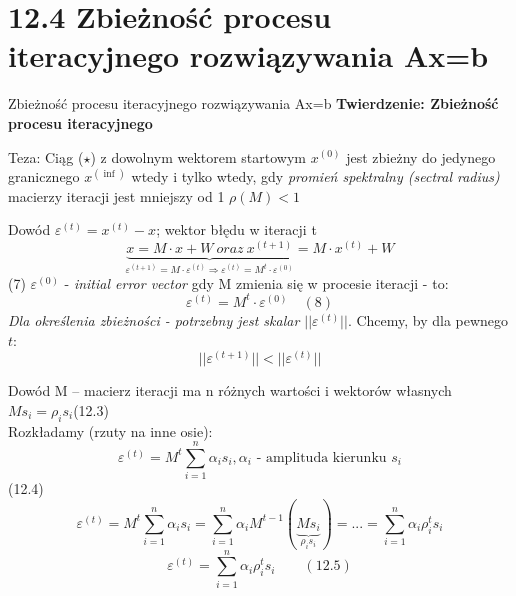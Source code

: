 \section{12.4 Zbieżność procesu iteracyjnego rozwiązywania Ax=b}

\begin{frame}{Zbieżność procesu iteracyjnego rozwiązywania Ax=b}
  \textbf{Twierdzenie: Zbieżność procesu iteracyjnego}
  \begin{block}{Teza:}
    \center Ciąg ($\star$) z dowolnym wektorem startowym $x^{(0)}$ jest zbieżny do jedynego granicznego $x^{(\inf)}$ wtedy i tylko wtedy, gdy \emph{promień spektralny (sectral radius)} macierzy iteracji jest mniejszy od 1
    \center $\rho(M)<1$
  \end{block}
\end{frame}

\begin{frame}{}
  \begin{block}{Dowód}
    $\varepsilon^{(t)}=x^{(t)}-x$; wektor błędu w iteracji t
    \[\underbrace{x=M \cdot x+W\ oraz\ x^{(t+1)}}_{\varepsilon^{(t+1)}=M \cdot \varepsilon^{(t)} \Rightarrow \varepsilon^{(t)}=M^t \cdot \varepsilon^{(0)}}=M \cdot x^{(t)}+W\]
    (7) $\varepsilon^{(0)}$ - \emph{initial error vector} gdy M zmienia się w procesie iteracji - to:
    \[{\varepsilon}^{(t)}=M^t \cdot {\varepsilon}^{(0)} \quad (8)\]
    \emph{Dla określenia zbieżności - potrzebny jest skalar $||\varepsilon^{(t)}||$}.
    Chcemy, by dla pewnego $t$:
    \[||\varepsilon^{(t+1)}||<||\varepsilon^{(t)}||\]
  \end{block}
\end{frame}

\begin{frame}{}
  \begin{block}{Dowód}
    M -- macierz iteracji ma n różnych wartości i wektorów własnych
    \\\hfill$Ms_i=\rho _is_i$\hfill (12.3)
    \\Rozkładamy (rzuty na inne osie):
    \[\varepsilon^{(t)}=M^t \sum_{i = 1}^{n} \alpha _i s_i , \alpha _i \text{ - amplituda kierunku } s_i\]
    \hfill\hfill(12.4)
    \[\varepsilon^{(t)}=M^t \sum_{i = 1}^{n} \alpha _i s_i = \sum_{i = 1}^{n} \alpha _i M^{t-1}(\underbrace{Ms_i}_{\rho _i s_i}) = ... = \sum_{i = 1}^{n} \alpha _i \rho _i^t s_i \]
    \[\boxed{\varepsilon^{(t)}=\sum_{i = 1}^{n} \alpha _i \rho _i^t s_i} \qquad (12.5)\]
  \end{block}
\end{frame}

